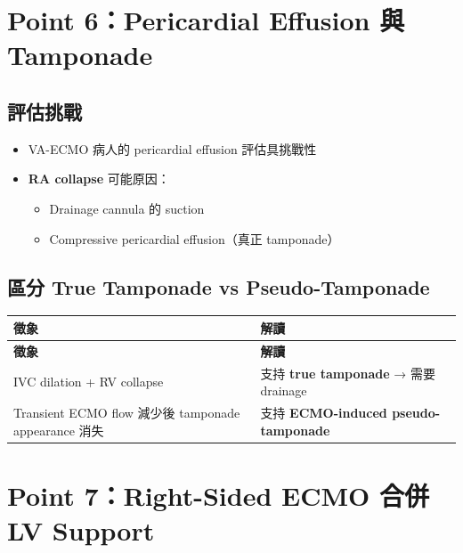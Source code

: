 \documentclass[12pt,a4paper]{article}
\begin{document}
\section{Point 6：Pericardial Effusion 與 Tamponade}

\subsection{評估挑戰}

\begin{itemize}
    \item VA-ECMO 病人的 pericardial effusion 評估具挑戰性
    \item \textbf{RA collapse} 可能原因：
    \begin{itemize}
        \item Drainage cannula 的 suction
        \item Compressive pericardial effusion（真正 tamponade）
    \end{itemize}
\end{itemize}

\subsection{區分 True Tamponade vs Pseudo-Tamponade}

\begin{longtable}{p{4cm}p{10cm}}
\toprule
\textbf{徵象} & \textbf{解讀} \\
\midrule
\endfirsthead

\toprule
\textbf{徵象} & \textbf{解讀} \\
\midrule
\endhead

\bottomrule
\endfoot

IVC dilation + RV collapse & 支持 \textbf{true tamponade} → 需要 drainage \\
\midrule
Transient ECMO flow 減少後 tamponade appearance 消失 & 支持 \textbf{ECMO-induced pseudo-tamponade} \\
\bottomrule
\end{longtable}

\section{Point 7：Right-Sided ECMO 合併 LV Support}
\end{document}
